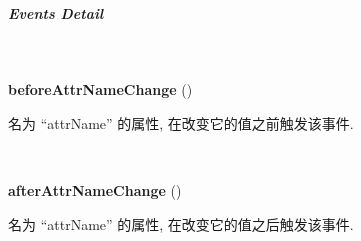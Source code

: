 \documentclass[letterpaper,10pt,english]{sphinxmanual}
\begin{document}
\subparagraph{Events Detail}
\label{api/core/base/attribute:events-detail}

\begin{fulllineitems}
\label{api/core/base/attribute:attribute.beforeAttrNameChange}~
\begin{DUlineblock}{0em}
\item[] \textbf{beforeAttrNameChange} ()
\item[] 名为 ``attrName'' 的属性, 在改变它的值之前触发该事件.
\end{DUlineblock}

\end{fulllineitems}



\begin{fulllineitems}
\label{api/core/base/attribute:attribute.afterAttrNameChange}~
\begin{DUlineblock}{0em}
\item[] \textbf{afterAttrNameChange} ()
\item[] 名为 ``attrName'' 的属性, 在改变它的值之后触发该事件.
\end{DUlineblock}

\end{fulllineitems}
\end{document}
